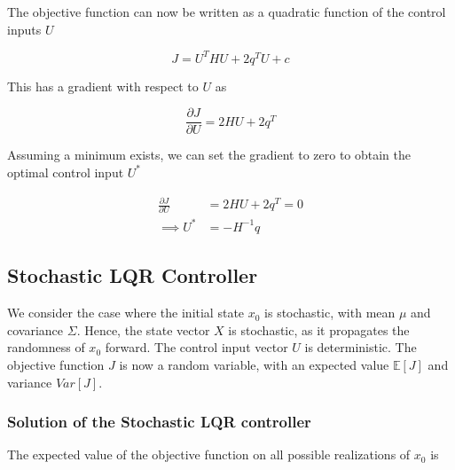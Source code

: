 \documentclass{article}
\begin{document}
The objective function can now be written as a quadratic function of the control inputs $U$

$$
J = U^T H U + 2 q^T U + c
$$

This has a gradient with respect to $U$ as

$$
\frac{\partial J}{\partial U} = 2 H U + 2 q^T
$$

Assuming a minimum exists, we can set the gradient to zero to obtain the optimal control input $U^*$

\begin{equation}
  \begin{aligned}
    \frac{\partial J}{\partial U} &= 2 H U + 2 q^T = 0 \\
    \implies U^* &= -H^{-1} q
  \end{aligned}
\end{equation}

\subsection{Stochastic LQR Controller} \label{lqr_ctrl_stoch}

We consider the case where the initial state $x_0$ is stochastic, with mean $\mu$ and covariance $\Sigma$.
Hence, the state vector $X$ is stochastic, as it propagates the randomness of $x_0$ forward.
The control input vector $U$ is deterministic. The objective function $J$ is now a random variable,
with an expected value $\mathbb{E}[J]$ and variance $Var[J]$.

\subsubsection{Solution of the Stochastic LQR controller}

The expected value of the objective function on all possible realizations of $x_0$ is
\end{document}
